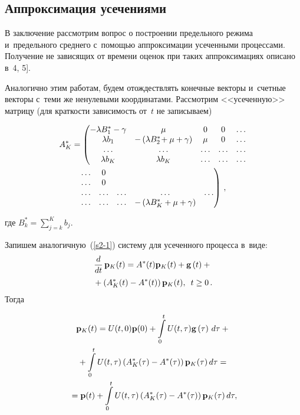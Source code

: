 \begin{multicols}{2}
\section{Аппроксимация усечениями}

В заключение рассмотрим вопрос о построении предельного режима и~предельного 
среднего с~помощью аппроксимации усеченными процессами.
Получение не зависящих от времени оценок при таких аппроксимациях описано в~4, 5].

Аналогично этим работам, будем отождествлять конечные векторы и~счетные 
векторы с~теми же ненулевыми координатами.
Рассмотрим <<усеченную>> матрицу (для краткости зависимость от~$t$ не записываем)

\noindent
\begin{multline*}
A_K^* =\left( \begin{matrix}
-\lambda B_1^* - \gamma & \mu & 0 & 0 &  \dots \\
\lambda b_1 & - \left (\lambda B_2^* \!+ \mu + \gamma \right ) & \mu   &  0 & \dots\\
\dots & \dots & \dots & \dots & \dots \\
\lambda b_K & \lambda b_K & \dots & \dots & \dots\\
\end{matrix}\right.\\
\left.
\begin{matrix}
\dots& 0 \\
\dots&  0 & \\
\dots&   \dots & \dots & \dots &\dots\\
 \dots&  \dots & \dots & - \left ( \lambda B_K^* + \mu + \gamma \right )
   \end{matrix}\right)\,,
   \end{multline*}

\noindent
где $B_k^*=\sum\nolimits_{j=k}^{K}b_j$.

Запишем аналогичную~(\ref{s2-1}) систему для усеченного процесса в~виде:
\begin{multline*}
\displaystyle\frac{\displaystyle d\mathstrut}{\displaystyle dt\mathstrut}\,{\bf p}_K(t)=A^*(t) {\bf p}_K (t)  +{\bf g}\left(t\right) +{}\\
{}+
\left(A^*_K(t)- A^*(t)\right) {\bf p}_K (t),  \enskip t \ge 0\,.
\end{multline*}
Тогда

\vspace*{-10pt}

\noindent
\begin{multline*}
{\bf p}_K(t) ={U}(t,0){\mathbf{p}}(0) + \int\limits_0^t {U}(t,\tau){\bf g}\left(\tau\right)\, d\tau + {}\\
{}+\int\limits_0^t {U}(t,\tau)\left(A^*_K(\tau)- A^*(\tau)\right){\bf p}_K (\tau)\, d\tau = {}\\
{}={\mathbf{p}}(t) +  \int\limits_0^t {U}(t,\tau)\left(A^*_K(\tau)- A^*(\tau)\right){\bf p}_K (\tau)\, d\tau , 
\end{multline*}


\end{multicols}
